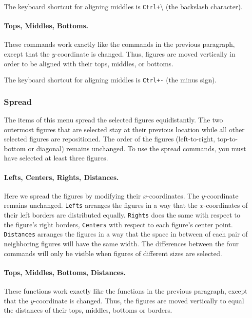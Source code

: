 The keyboard shortcut for aligning middles is \texttt{Ctrl+}{\textbackslash} 
(the backslash character).

\paragraph{Tops, Middles, Bottoms.}
These commands work exactly like the commands in the previous
paragraph, except that the $y$-coor\-dinate is changed.
Thus, figures are moved vertically in order to be aligned
with their tops, middles, or bottoms.

The keyboard shortcut for aligning middles is \texttt{Ctrl+-} (the minus sign).

\subsubsection{Spread}

The items of this menu spread the selected figures equidistantly.
The two outermost figures that are selected stay at their previous location
while all other selected figures are repositioned.
The order of the figures (left-to-right, top-to-bottom or
diagonal) remains unchanged.
To use the spread commands, you must have selected at least three
figures.

\paragraph{Lefts, Centers, Rights, Distances.}
Here we spread the figures by modifying their $x$-coordinates. The
$y$-coordinate remains unchanged.
\texttt{Lefts} arranges the figures in a way that the
$x$-coordinates of their left borders are distributed equally.
\texttt{Rights} does the same with respect to the figure's right
borders, \texttt{Centers} with respect to each figure's center
point.
\texttt{Distances} arranges the figures in a way that the space
in between of each pair of neighboring figures will have the same
width.
The differences between the four commands will only be visible
when figures of different sizes are selected.

\paragraph{Tops, Middles, Bottoms, Distances.}
These functions work exactly like the functions in the previous
paragraph, except that the $y$-coordinate is changed.
Thus, the figures are moved vertically to equal the distances of
their tops, middles, bottoms or borders.

